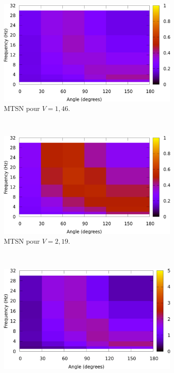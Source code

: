 	\begin{figure}[!htb]
		\centering
		\begin{subfigure}[t]{\subImgWlineplot}
			\centering
			\includegraphics[width=\textwidth]{figures/ch4/average_times_054}
			\caption{MTSN pour $V = 1,46$.}
			\label{fig:hmap_t_146}
		\end{subfigure}
		~
		\begin{subfigure}[t]{\subImgWlineplot}
			\centering
			\includegraphics[width=\textwidth]{figures/ch4/average_times_081}
			\caption{MTSN pour $V = 2,19$.}
			\label{fig:hmap_t_219}
		\end{subfigure}
		~
		\begin{subfigure}[t]{\subImgWlineplot}
			\centering
			\includegraphics[width=\textwidth]{figures/ch4/average_error_rates_054}

\end{subfigure}
\end{figure}
